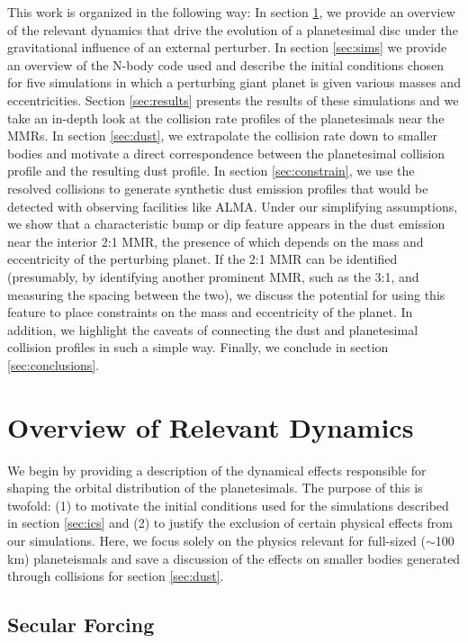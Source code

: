 \documentclass[fleqn,usenatbib]{mnras}
\begin{document}
This work is organized in the following way: In section \ref{sec:dynamics}, we provide an overview of the relevant dynamics that drive the evolution 
of a planetesimal disc under the gravitational influence of an external perturber. In section \ref{sec:sims} we provide an overview of the N-body code 
used and describe the initial conditions chosen for five simulations in which a perturbing giant planet is given various masses  and eccentricities. Section
\ref{sec:results} presents the results of these simulations and we take an in-depth look at the collision rate profiles of the planetesimals near the MMRs. 
In section \ref{sec:dust},  we extrapolate the collision rate down to smaller bodies and motivate a direct correspondence between the planetesimal collision profile
and the resulting dust profile. In section \ref{sec:constrain}, we use the resolved collisions to generate synthetic dust 
emission profiles that would be detected with observing facilities like ALMA. Under our simplifying assumptions, we show that a characteristic bump 
or dip feature appears in the dust emission near the interior 2:1 MMR, the presence of which depends on the mass and eccentricity of the perturbing 
planet. If the 2:1 MMR can be identified (presumably, by identifying another prominent MMR, such as the 3:1, and measuring the spacing between the two), we discuss the 
potential for using this feature to place constraints on the mass and eccentricity of the planet. In addition, we highlight the caveats of connecting the dust and planetesimal collision 
profiles in such a simple way. Finally, we conclude in section \ref{sec:conclusions}.

\section{Overview of Relevant Dynamics} \label{sec:dynamics}

We begin by providing a description of the dynamical effects responsible for shaping the orbital distribution of the planetesimals. The purpose of this is twofold: (1) to motivate
the initial conditions used for the simulations described in section \ref{sec:ics} and (2) to justify the exclusion of certain physical effects from our simulations. Here, we focus solely on the 
physics relevant for full-sized ($\sim$100 km) planeteismals and save a discussion of the effects on smaller bodies generated through collisions for section \ref{sec:dust}.

\subsection{Secular Forcing}\label{sec:sec_force}
\end{document}
